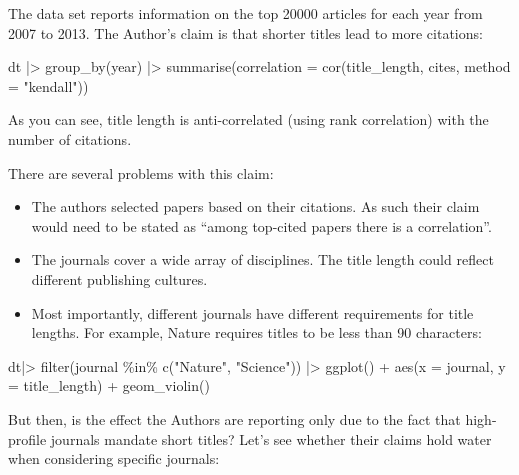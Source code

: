 \documentclass[
  letterpaper,
  DIV=11,
  numbers=noendperiod]{scrreprt}
\newenvironment{Shaded}{\begin{snugshade}}{\end{snugshade}}
\newcommand{\NormalTok}[1]{\textcolor[rgb]{0.00,0.23,0.31}{#1}}
\providecommand{\tightlist}{%
  \setlength{\itemsep}{0pt}\setlength{\parskip}{0pt}}\usepackage{longtable,booktabs,array}
\begin{document}
The data set reports information on the top 20000 articles for each year
from 2007 to 2013. The Author's claim is that shorter titles lead to
more citations:

\begin{Shaded}
\begin{Highlighting}[]
\NormalTok{dt |\textgreater{} }
\NormalTok{  group\_by(year) |\textgreater{} }
\NormalTok{  summarise(correlation = cor(title\_length, cites, method = "kendall"))}
\end{Highlighting}
\end{Shaded}

As you can see, title length is anti-correlated (using rank correlation)
with the number of citations.

There are several problems with this claim:

\begin{itemize}
\tightlist
\item
  The authors selected papers based on their citations. As such their
  claim would need to be stated as ``among top-cited papers there is a
  correlation''.
\item
  The journals cover a wide array of disciplines. The title length could
  reflect different publishing cultures.
\item
  Most importantly, different journals have different requirements for
  title lengths. For example, Nature requires titles to be less than 90
  characters:
\end{itemize}

\begin{Shaded}
\begin{Highlighting}[]
\NormalTok{dt|\textgreater{} filter(journal \%in\% c("Nature", "Science")) |\textgreater{} }
\NormalTok{  ggplot() + aes(x = journal, y = title\_length) + geom\_violin()}
\end{Highlighting}
\end{Shaded}

But then, is the effect the Authors are reporting only due to the fact
that high-profile journals mandate short titles? Let's see whether their
claims hold water when considering specific journals:
\end{document}
